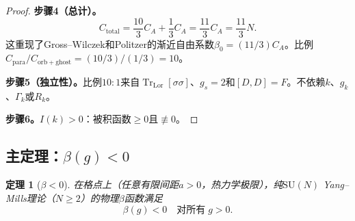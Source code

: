 \documentclass[12pt,a4paper]{article}
\theoremstyle{plain}
\newtheorem{theorem}{定理}[section]\newtheorem{lemma}[theorem]{引理}\newtheorem{corollary}[theorem]{推论}\newtheorem{proposition}[theorem]{命题}
\theoremstyle{definition}\newtheorem{definition}[theorem]{定义}
\theoremstyle{remark}\newtheorem{remark}[theorem]{注记}
\begin{document}
\begin{proof}
\textbf{步骤4（总计）。}
\begin{equation}\label{eq:Ctotal}
C_{\mathrm{total}} = \frac{10}{3}C_A + \frac{1}{3}C_A = \frac{11}{3}C_A = \frac{11}{3}N.
\end{equation}
这重现了Gross--Wilczek\cite{GrossWilczek1973}和Politzer\cite{Politzer1973}的渐近自由系数$\beta_0=(11/3)C_A$。比例$C_{\mathrm{para}}/C_{\mathrm{orb+ghost}}=(10/3)/(1/3)=10$。

\textbf{步骤5（独立性）。}比例$10{:}1$来自$\operatorname{Tr}_{\mathrm{Lor}}[\sigma\sigma]$、$g_s=2$和$[D,D]=F$。不依赖$k$、$g_k$、$\Gamma_k$或$R_k$。

\textbf{步骤6。}$I(k)>0$：被积函数$\geq 0$且$\not\equiv 0$。
\end{proof}

\subsection{主定理：$\beta(g)<0$}\label{sec:mainbeta}

\begin{theorem}[$\beta<0$]\label{thm:beta}
在格点上（任意有限间距$a>0$，热力学极限），纯$\mathrm{SU}(N)$ Yang--Mills理论（$N\geq 2$）的物理$\beta$函数满足
\begin{equation}\label{eq:betaneg}
\beta(g) < 0 \quad \text{对所有}\;g>0.
\end{equation}
\end{theorem}
\end{document}
